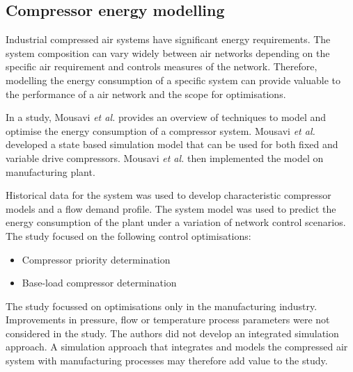 \subsection{Compressor energy modelling}
Industrial compressed air systems have significant energy requirements. The system composition can vary widely between air networks depending on the specific air requirement and controls measures of the network. Therefore, modelling the energy consumption of a specific system can provide valuable to the performance of a air network and the scope for optimisations.
\par 
In a study, Mousavi \textit{et al.} \cite{mousavi2014energy} provides an overview of techniques to model and optimise the energy consumption of a compressor system. Mousavi \textit{et al.} developed a state based simulation model that can be used for both fixed and variable drive compressors. Mousavi \textit{et al.} then implemented the model on manufacturing plant.
\par 
 Historical data for the system was used to develop characteristic compressor models and a flow demand profile. The system model was used to predict the energy consumption of the plant under a variation of network control scenarios. The study focused on the following control optimisations:
 \begin{itemize}
 	\item Compressor priority determination
 	\item Base-load compressor determination
 \end{itemize}
\par
The study focussed on optimisations only in the manufacturing industry. Improvements in pressure, flow or temperature process parameters were not considered in the study. The authors did not develop an integrated simulation approach. A simulation approach that integrates and models the compressed air system with manufacturing processes may therefore add value to the study.
